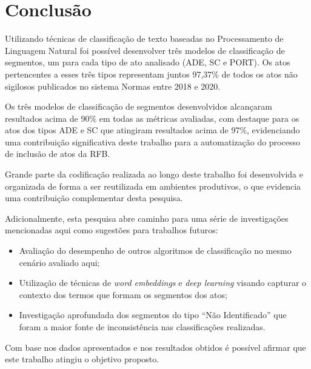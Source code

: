 \section{Conclusão}

Utilizando técnicas de classificação de texto baseadas no Processamento de Linguagem Natural foi possível desenvolver três modelos de classificação de segmentos, um para cada tipo de ato analisado (ADE, SC e PORT). Os atos pertencentes a esses três tipos representam juntos 97,37\% de todos os atos não sigilosos publicados no sistema Normas entre 2018 e 2020.

Os três modelos de classificação de segmentos desenvolvidos alcançaram resultados acima de 90\% em todas as métricas avaliadas, com destaque para os atos dos tipos ADE e SC que atingiram resultados acima de 97\%, evidenciando uma contribuição significativa deste trabalho para a automatização do processo de inclusão de atos da RFB.

Grande parte da codificação realizada ao longo deste trabalho foi desenvolvida e organizada de forma a ser reutilizada em ambientes produtivos, o que evidencia uma contribuição complementar desta pesquisa.

Adicionalmente, esta pesquisa abre caminho para uma série de investigações mencionadas aqui como sugestões para trabalhos futuros: 
\begin{itemize}
	\item Avaliação do desempenho de outros algoritmos de classificação no mesmo cenário avaliado aqui;
	\item Utilização de técnicas de \textit{word embeddings} e \textit{deep learning} visando capturar o contexto dos termos que formam os segmentos dos atos;
	\item Investigação aprofundada dos segmentos do tipo ``Não Identificado'' que foram a maior fonte de inconsistência nas classificações realizadas.
\end{itemize}

Com base nos dados apresentados e nos resultados obtidos é possível afirmar que este trabalho atingiu o objetivo proposto.


\begin{figure}
\label{fig:fake}
\end{figure}